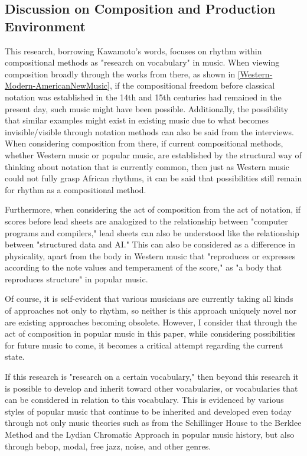 \subsection{Discussion on Composition and Production Environment}

This research, borrowing Kawamoto's words, focuses on rhythm within compositional methods as "research on vocabulary" in music. When viewing composition broadly through the works from there, as shown in \ref{Western-Modern-AmericanNewMusic}, if the compositional freedom before classical notation was established in the 14th and 15th centuries had remained in the present day, such music might have been possible. Additionally, the possibility that similar examples might exist in existing music due to what becomes invisible/visible through notation methods can also be said from the interviews. When considering composition from there, if current compositional methods, whether Western music or popular music, are established by the structural way of thinking about notation that is currently common, then just as Western music could not fully grasp African rhythms, it can be said that possibilities still remain for rhythm as a compositional method.

Furthermore, when considering the act of composition from the act of notation, if scores before lead sheets are analogized to the relationship between "computer programs and compilers," lead sheets can also be understood like the relationship between "structured data and AI." This can also be considered as a difference in physicality, apart from the body in Western music that "reproduces or expresses according to the note values and temperament of the score," as "a body that reproduces structure" in popular music.

Of course, it is self-evident that various musicians are currently taking all kinds of approaches not only to rhythm, so neither is this approach uniquely novel nor are existing approaches becoming obsolete. However, I consider that through the act of composition in popular music in this paper, while considering possibilities for future music to come, it becomes a critical attempt regarding the current state.

If this research is "research on a certain vocabulary," then beyond this research it is possible to develop and inherit toward other vocabularies, or vocabularies that can be considered in relation to this vocabulary. This is evidenced by various styles of popular music that continue to be inherited and developed even today through not only music theories such as from the Schillinger House to the Berklee Method and the Lydian Chromatic Approach in popular music history, but also through bebop, modal, free jazz, noise, and other genres.

